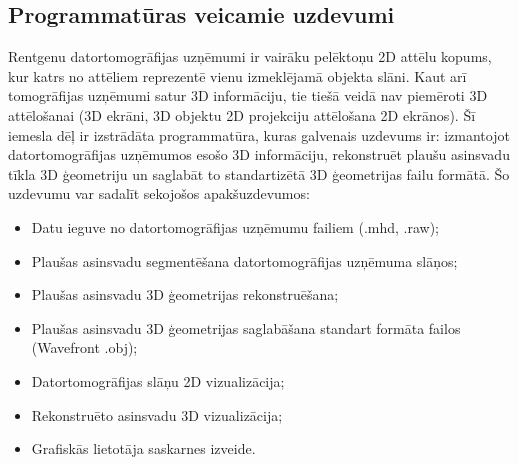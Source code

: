 \subsection{Programmatūras veicamie uzdevumi}

Rentgenu datortomogrāfijas uzņēmumi ir vairāku pelēktoņu 2D attēlu kopums, kur katrs no attēliem reprezentē vienu izmeklējamā objekta slāni. Kaut arī tomogrāfijas uzņēmumi satur 3D informāciju, tie tiešā veidā nav piemēroti 3D attēlošanai (3D ekrāni, 3D objektu 2D projekciju attēlošana 2D ekrānos). Šī iemesla dēļ ir izstrādāta programmatūra, kuras galvenais uzdevums ir: izmantojot datortomogrāfijas uzņēmumos esošo 3D informāciju, rekonstruēt plaušu asinsvadu tīkla 3D ģeometriju un saglabāt to  standartizētā 3D ģeometrijas failu formātā. 
Šo uzdevumu var sadalīt sekojošos apakšuzdevumos:
\begin{itemize}
\item{} Datu ieguve no datortomogrāfijas uzņēmumu failiem (.mhd, .raw);
\item{} Plaušas asinsvadu segmentēšana datortomogrāfijas uzņēmuma slāņos; 
\item{} Plaušas asinsvadu 3D ģeometrijas rekonstruēšana;
\item{} Plaušas asinsvadu 3D ģeometrijas saglabāšana standart formāta failos (Wavefront .obj);
\item{} Datortomogrāfijas slāņu 2D vizualizācija;
\item{} Rekonstruēto asinsvadu 3D vizualizācija;
\item{} Grafiskās lietotāja saskarnes izveide.
\end{itemize}

